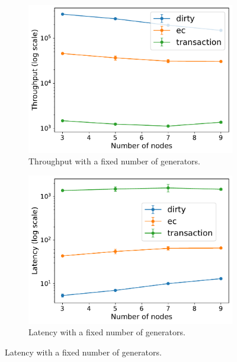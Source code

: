\begin{figure}[htp]
  \centering
  \begin{subfigure}[t]{0.49\columnwidth}
    \centering
    \includegraphics[width=\columnwidth]{figures/tp_nodes_fixgen_caelum.pdf}
    \caption{Throughput with a fixed number of generators.}
    \label{fig:tp nodes fixgen caelum}
  \end{subfigure}
  \begin{subfigure}[t]{0.49\columnwidth}
    \centering
    \includegraphics[width=\columnwidth]{figures/lat_nodes_fixgen_caelum.pdf}
    \caption{Latency with a fixed number of generators.}
    \label{fig:lat nodes fixgen caelum}
  \end{subfigure}


\end{figure}
